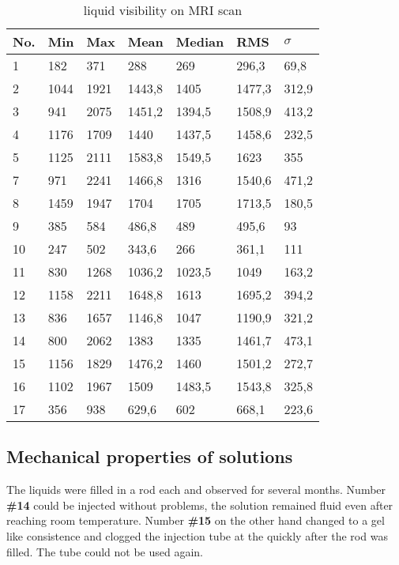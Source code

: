 \begin{table}[!htb]
\centering
\begin{tabular}{@{}lllllll@{}}
\toprule
No. & Min  & Max  & Mean   & Median & RMS    & $\sigma$   \\ \midrule
1   & 182  & 371  & 288    & 269    & 296,3  & 69,8   \\
2   & 1044 & 1921 & 1443,8 & 1405   & 1477,3 & 312,9  \\
3   & 941  & 2075 & 1451,2 & 1394,5 & 1508,9 & 413,2  \\
4   & 1176 & 1709 & 1440   & 1437,5 & 1458,6 & 232,5  \\
5   & 1125 & 2111 & 1583,8 & 1549,5 & 1623   & 355    \\
7   & 971  & 2241 & 1466,8 & 1316   & 1540,6 & 471,2  \\
8   & 1459 & 1947 & 1704   & 1705   & 1713,5 & 180,5  \\
9   & 385  & 584  & 486,8  & 489    & 495,6  & 93     \\
10  & 247  & 502  & 343,6  & 266    & 361,1  & 111    \\
11  & 830  & 1268 & 1036,2 & 1023,5 & 1049   & 163,2  \\
12  & 1158 & 2211 & 1648,8 & 1613   & 1695,2 & 394,2  \\
13  & 836  & 1657 & 1146,8 & 1047   & 1190,9 & 321,2  \\
14  & 800  & 2062 & 1383   & 1335   & 1461,7 & 473,1  \\
15  & 1156 & 1829 & 1476,2 & 1460   & 1501,2 & 272,7  \\
16  & 1102 & 1967 & 1509   & 1483,5 & 1543,8 & 325,8  \\
17  & 356  & 938  & 629,6  & 602    & 668,1  & 223,6  \\ \bottomrule
\end{tabular}
\caption{liquid visibility on MRI scan}
\label{tab:visibility}
\end{table}

\clearpage

\subsection{Mechanical properties of solutions}
\label{sec:sol-mech}

The liquids were filled in a rod each and observed for several months.
Number \textbf{\#14} could be injected without problems, the solution remained fluid even after reaching room temperature.
Number \textbf{\#15} on the other hand changed to a gel like consistence and clogged the injection tube at the quickly after the rod was filled.
The tube could not be used again.


